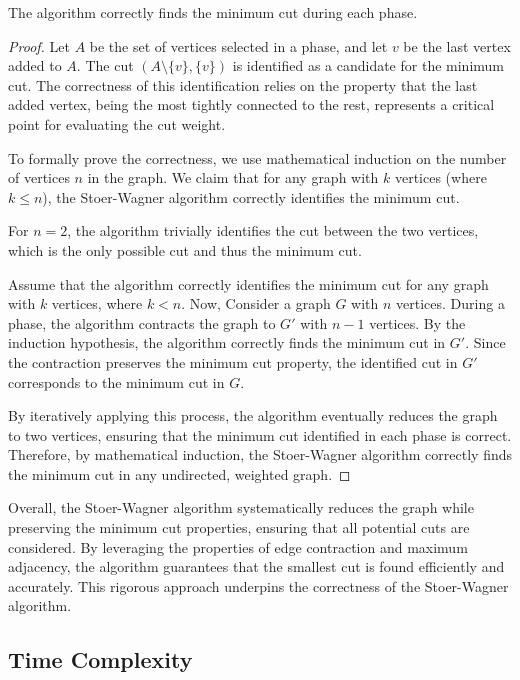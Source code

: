 \begin{theorem}
    The algorithm correctly finds the minimum cut during each phase.
\end{theorem}

\begin{proof}
    Let \( A \) be the set of vertices selected in a phase, and let \( v \) be the last vertex added to \( A \). The cut \((A \setminus \{v\}, \{v\})\) is identified as a candidate for the minimum cut. The correctness of this identification relies on the property that the last added vertex, being the most tightly connected to the rest, represents a critical point for evaluating the cut weight.
    
    To formally prove the correctness, we use mathematical induction on the number of vertices \( n \) in the graph. We claim that for any graph with \( k \) vertices (where \( k \leq n \)), the Stoer-Wagner algorithm correctly identifies the minimum cut.
    
    For \( n = 2 \), the algorithm trivially identifies the cut between the two vertices, which is the only possible cut and thus the minimum cut.
    
    Assume that the algorithm correctly identifies the minimum cut for any graph with \( k \) vertices, where \( k < n \). Now, Consider a graph \( G \) with \( n \) vertices. During a phase, the algorithm contracts the graph to \( G' \) with \( n-1 \) vertices. By the induction hypothesis, the algorithm correctly finds the minimum cut in \( G' \). Since the contraction preserves the minimum cut property, the identified cut in \( G' \) corresponds to the minimum cut in \( G \).
    
    By iteratively applying this process, the algorithm eventually reduces the graph to two vertices, ensuring that the minimum cut identified in each phase is correct. Therefore, by mathematical induction, the Stoer-Wagner algorithm correctly finds the minimum cut in any undirected, weighted graph.
\end{proof}

Overall, the Stoer-Wagner algorithm systematically reduces the graph while preserving the minimum cut properties, ensuring that all potential cuts are considered. By leveraging the properties of edge contraction and maximum adjacency, the algorithm guarantees that the smallest cut is found efficiently and accurately. This rigorous approach underpins the correctness of the Stoer-Wagner algorithm.


\subsection{Time Complexity}

